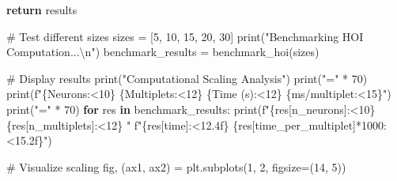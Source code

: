 \documentclass[
  11pt,
  letterpaper,
  oneside,
  openany]{book}
\newenvironment{Shaded}{\begin{snugshade}}{\end{snugshade}}
\newcommand{\BuiltInTok}[1]{\textcolor[rgb]{0.00,0.23,0.31}{#1}}
\newcommand{\CharTok}[1]{\textcolor[rgb]{0.13,0.47,0.30}{#1}}
\newcommand{\CommentTok}[1]{\textcolor[rgb]{0.37,0.37,0.37}{#1}}
\newcommand{\ControlFlowTok}[1]{\textcolor[rgb]{0.00,0.23,0.31}{\textbf{#1}}}
\newcommand{\DecValTok}[1]{\textcolor[rgb]{0.68,0.00,0.00}{#1}}
\newcommand{\KeywordTok}[1]{\textcolor[rgb]{0.00,0.23,0.31}{\textbf{#1}}}
\newcommand{\NormalTok}[1]{\textcolor[rgb]{0.00,0.23,0.31}{#1}}
\newcommand{\OperatorTok}[1]{\textcolor[rgb]{0.37,0.37,0.37}{#1}}
\newcommand{\SpecialCharTok}[1]{\textcolor[rgb]{0.37,0.37,0.37}{#1}}
\newcommand{\SpecialStringTok}[1]{\textcolor[rgb]{0.13,0.47,0.30}{#1}}
\newcommand{\StringTok}[1]{\textcolor[rgb]{0.13,0.47,0.30}{#1}}
\begin{document}
\begin{Shaded}
\begin{Highlighting}[]
    \ControlFlowTok{return}\NormalTok{ results}

\CommentTok{\# Test different sizes}
\NormalTok{sizes }\OperatorTok{=}\NormalTok{ [}\DecValTok{5}\NormalTok{, }\DecValTok{10}\NormalTok{, }\DecValTok{15}\NormalTok{, }\DecValTok{20}\NormalTok{, }\DecValTok{30}\NormalTok{]}
\BuiltInTok{print}\NormalTok{(}\StringTok{"Benchmarking HOI Computation...}\CharTok{\textbackslash{}n}\StringTok{"}\NormalTok{)}
\NormalTok{benchmark\_results }\OperatorTok{=}\NormalTok{ benchmark\_hoi(sizes)}

\CommentTok{\# Display results}
\BuiltInTok{print}\NormalTok{(}\StringTok{"Computational Scaling Analysis"}\NormalTok{)}
\BuiltInTok{print}\NormalTok{(}\StringTok{"="} \OperatorTok{*} \DecValTok{70}\NormalTok{)}
\BuiltInTok{print}\NormalTok{(}\SpecialStringTok{f"}\SpecialCharTok{\{}\StringTok{\textquotesingle{}Neurons\textquotesingle{}}\SpecialCharTok{:\textless{}10\}}\SpecialStringTok{ }\SpecialCharTok{\{}\StringTok{\textquotesingle{}Multiplets\textquotesingle{}}\SpecialCharTok{:\textless{}12\}}\SpecialStringTok{ }\SpecialCharTok{\{}\StringTok{\textquotesingle{}Time (s)\textquotesingle{}}\SpecialCharTok{:\textless{}12\}}\SpecialStringTok{ }\SpecialCharTok{\{}\StringTok{\textquotesingle{}ms/multiplet\textquotesingle{}}\SpecialCharTok{:\textless{}15\}}\SpecialStringTok{"}\NormalTok{)}
\BuiltInTok{print}\NormalTok{(}\StringTok{"="} \OperatorTok{*} \DecValTok{70}\NormalTok{)}
\ControlFlowTok{for}\NormalTok{ res }\KeywordTok{in}\NormalTok{ benchmark\_results:}
    \BuiltInTok{print}\NormalTok{(}\SpecialStringTok{f"}\SpecialCharTok{\{}\NormalTok{res[}\StringTok{\textquotesingle{}n\_neurons\textquotesingle{}}\NormalTok{]}\SpecialCharTok{:\textless{}10\}}\SpecialStringTok{ }\SpecialCharTok{\{}\NormalTok{res[}\StringTok{\textquotesingle{}n\_multiplets\textquotesingle{}}\NormalTok{]}\SpecialCharTok{:\textless{}12\}}\SpecialStringTok{ "}
          \SpecialStringTok{f"}\SpecialCharTok{\{}\NormalTok{res[}\StringTok{\textquotesingle{}time\textquotesingle{}}\NormalTok{]}\SpecialCharTok{:\textless{}12.4f\}}\SpecialStringTok{ }\SpecialCharTok{\{}\NormalTok{res[}\StringTok{\textquotesingle{}time\_per\_multiplet\textquotesingle{}}\NormalTok{]}\OperatorTok{*}\DecValTok{1000}\SpecialCharTok{:\textless{}15.2f\}}\SpecialStringTok{"}\NormalTok{)}

\CommentTok{\# Visualize scaling}
\NormalTok{fig, (ax1, ax2) }\OperatorTok{=}\NormalTok{ plt.subplots(}\DecValTok{1}\NormalTok{, }\DecValTok{2}\NormalTok{, figsize}\OperatorTok{=}\NormalTok{(}\DecValTok{14}\NormalTok{, }\DecValTok{5}\NormalTok{))}


\end{Highlighting}
\end{Shaded}
\end{document}
